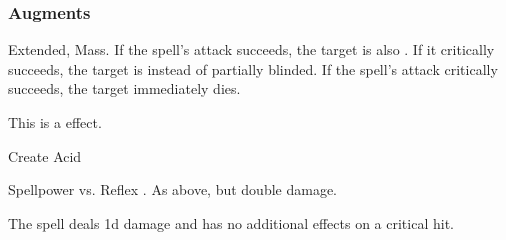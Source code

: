 \subsubsection{Augments}
 Extended, Mass.
If the spell's attack succeeds, the target is also \partiallyblinded. If it critically succeeds, the target is \blinded instead of partially blinded.
If the spell's attack critically succeeds, the target immediately dies.
\par
This is a  effect.
\begin{spellsection}{Create Acid}
\begin{spellheader}
\end{spellheader}
\begin{spellcontent}
\begin{spelltargetinginfo}
\end{spelltargetinginfo}
\begin{spelleffects}
\begin{spellattack}{Spellpower vs. Reflex}
\spellsuccess {}.
\spellcritical As above, but double damage.
\end{spellattack}
\end{spelleffects}
\end{spellcontent}
\begin{spellfooter}
\miscastexplode
\end{spellfooter}
\begin{spellcantrip}
The spell deals \minus1d damage and has no additional effects on a critical hit.
\end{spellcantrip}
\end{spellsection}
